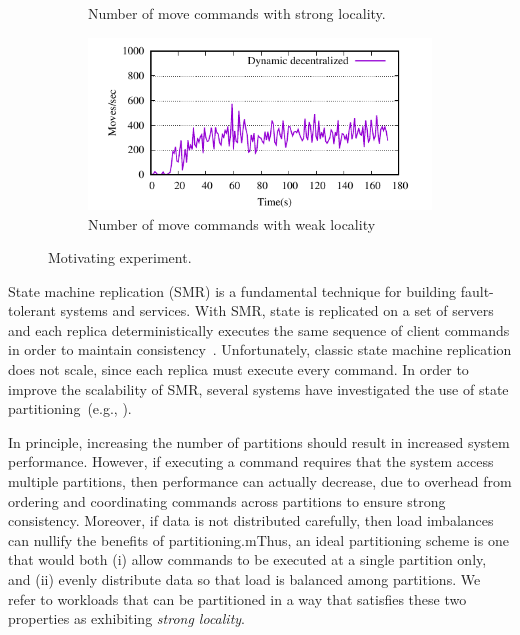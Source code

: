 \begin{figure}[ht!]
\begin{subfigure}[b]{0.45\textwidth}
    \caption{Number of move commands with strong locality.}
  \end{subfigure}
  \begin{subfigure}[b]{0.45\textwidth}
    \centering
    \includegraphics[width=0.95\columnwidth]{figures/motivation-moves-weak-locality}
    \caption{Number of move commands with weak locality}
  \end{subfigure}
  \caption{Motivating experiment.}
  \label{fig:motivation}
\end{figure}




State machine replication (SMR) is a fundamental technique for
building fault-tolerant systems and services. With SMR, state is
replicated on a set of servers and each replica deterministically
executes the same sequence of client commands in order to maintain
consistency~\cite{Lam78,Sch90}. Unfortunately, classic state machine replication does not
scale, since each replica must execute every command. In order to
improve the scalability of SMR, several systems have investigated the
use of state partitioning~(e.g., \cite{corbett2013spanner, bezerra2014ssmr,Glendenning:2011kj,
  Aguilera:2007,bli16edcc}).

In principle, increasing the number of partitions should result in
increased system performance. However, if executing a command requires
that the system access multiple partitions, then performance can
actually decrease, due to overhead from ordering and coordinating
commands across partitions to ensure strong consistency. Moreover, if
data is not distributed carefully, then load imbalances can nullify
the benefits of partitioning.mThus, an ideal partitioning scheme is
one that would both (i) allow commands to be executed at a single
partition only, and (ii) evenly distribute data so that load is
balanced among partitions.  We refer to workloads that can be
partitioned in a way that satisfies these two properties as exhibiting
\emph{strong locality}.

